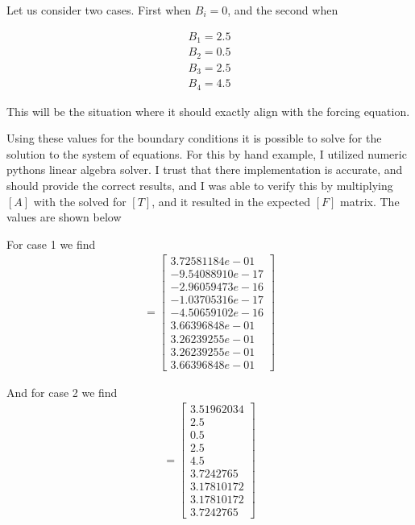 \documentclass[9pt]{amsart}
\begin{document}
Let us consider two cases. First when $B_i=0$, and the second when

\begin{align*}
  B_1=2.5\\
  B_2=0.5\\
  B_3=2.5\\
  B_4=4.5
\end{align*}

This will be the situation where it should exactly align with the forcing
equation.

Using these values for the boundary conditions it is possible to solve for the
solution to the system of equations. For this by hand example, I utilized
numeric pythons linear algebra solver. I trust that there implementation is
accurate, and should provide the correct results, and I was able to verify this
by multiplying $[A]$ with the solved for $[T]$, and it resulted in the expected
$[F]$ matrix. The values are shown below

\begin{multicols}{2}
  For case 1 we find
  \begin{align*}
    [T]=\begin{bmatrix}
      3.72581184e-01\\
      -9.54088910e-17\\
      -2.96059473e-16\\
      -1.03705316e-17\\
      -4.50659102e-16\\
      3.66396848e-01\\
      3.26239255e-01\\
      3.26239255e-01\\
      3.66396848e-01
    \end{bmatrix}
  \end{align*}

  And for case 2 we find
  \begin{align*}
    [T]=\begin{bmatrix}
      3.51962034 \\2.5\\        0.5 \\       2.5\\        4.5   \\
      3.7242765\\
      3.17810172 \\3.17810172 \\3.7242765
    \end{bmatrix}
  \end{align*}
\end{multicols}
\end{document}
